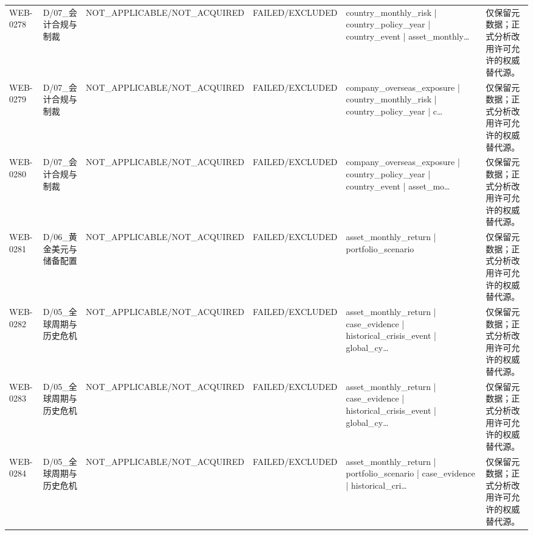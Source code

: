 \begin{landscape}
\begin{longtable}{p{1.8cm}p{2.6cm}p{2.6cm}p{2.6cm}p{4.8cm}p{7.2cm}}
WEB-0278 & D/\allowbreak{}07\_\allowbreak{}会计合规与制裁 & NOT\_\allowbreak{}APPLICABLE/\allowbreak{}NOT\_\allowbreak{}ACQUIRED & FAILED/\allowbreak{}EXCLUDED & country\_\allowbreak{}monthly\_\allowbreak{}risk | country\_\allowbreak{}policy\_\allowbreak{}year | country\_\allowbreak{}event | asset\_\allowbreak{}monthly… & 仅保留元数据；正式分析改用许可允许的权威替代源。\\
WEB-0279 & D/\allowbreak{}07\_\allowbreak{}会计合规与制裁 & NOT\_\allowbreak{}APPLICABLE/\allowbreak{}NOT\_\allowbreak{}ACQUIRED & FAILED/\allowbreak{}EXCLUDED & company\_\allowbreak{}overseas\_\allowbreak{}exposure | country\_\allowbreak{}monthly\_\allowbreak{}risk | country\_\allowbreak{}policy\_\allowbreak{}year | c… & 仅保留元数据；正式分析改用许可允许的权威替代源。\\
WEB-0280 & D/\allowbreak{}07\_\allowbreak{}会计合规与制裁 & NOT\_\allowbreak{}APPLICABLE/\allowbreak{}NOT\_\allowbreak{}ACQUIRED & FAILED/\allowbreak{}EXCLUDED & company\_\allowbreak{}overseas\_\allowbreak{}exposure | country\_\allowbreak{}policy\_\allowbreak{}year | country\_\allowbreak{}event | asset\_\allowbreak{}mo… & 仅保留元数据；正式分析改用许可允许的权威替代源。\\
WEB-0281 & D/\allowbreak{}06\_\allowbreak{}黄金美元与储备配置 & NOT\_\allowbreak{}APPLICABLE/\allowbreak{}NOT\_\allowbreak{}ACQUIRED & FAILED/\allowbreak{}EXCLUDED & asset\_\allowbreak{}monthly\_\allowbreak{}return | portfolio\_\allowbreak{}scenario & 仅保留元数据；正式分析改用许可允许的权威替代源。\\
WEB-0282 & D/\allowbreak{}05\_\allowbreak{}全球周期与历史危机 & NOT\_\allowbreak{}APPLICABLE/\allowbreak{}NOT\_\allowbreak{}ACQUIRED & FAILED/\allowbreak{}EXCLUDED & asset\_\allowbreak{}monthly\_\allowbreak{}return | case\_\allowbreak{}evidence | historical\_\allowbreak{}crisis\_\allowbreak{}event | global\_\allowbreak{}cy… & 仅保留元数据；正式分析改用许可允许的权威替代源。\\
WEB-0283 & D/\allowbreak{}05\_\allowbreak{}全球周期与历史危机 & NOT\_\allowbreak{}APPLICABLE/\allowbreak{}NOT\_\allowbreak{}ACQUIRED & FAILED/\allowbreak{}EXCLUDED & asset\_\allowbreak{}monthly\_\allowbreak{}return | case\_\allowbreak{}evidence | historical\_\allowbreak{}crisis\_\allowbreak{}event | global\_\allowbreak{}cy… & 仅保留元数据；正式分析改用许可允许的权威替代源。\\
WEB-0284 & D/\allowbreak{}05\_\allowbreak{}全球周期与历史危机 & NOT\_\allowbreak{}APPLICABLE/\allowbreak{}NOT\_\allowbreak{}ACQUIRED & FAILED/\allowbreak{}EXCLUDED & asset\_\allowbreak{}monthly\_\allowbreak{}return | portfolio\_\allowbreak{}scenario | case\_\allowbreak{}evidence | historical\_\allowbreak{}cri… & 仅保留元数据；正式分析改用许可允许的权威替代源。\\

\end{longtable}
\end{landscape}
